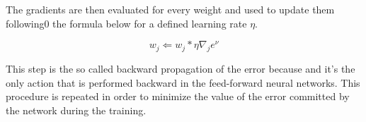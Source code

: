 The gradients are then evaluated for every weight and used to update them following0 the formula below for a defined
learning rate $\eta$.

\begin{equation} \label{eq:weights-update}
    w_j \Leftarrow w_j * \eta \nabla_j e^\nu
\end{equation}

This step is the so called backward propagation of the error because and it's the only action that is
performed backward in the feed-forward neural networks. This procedure is repeated in order to minimize
the value of the error committed by the network during the training.